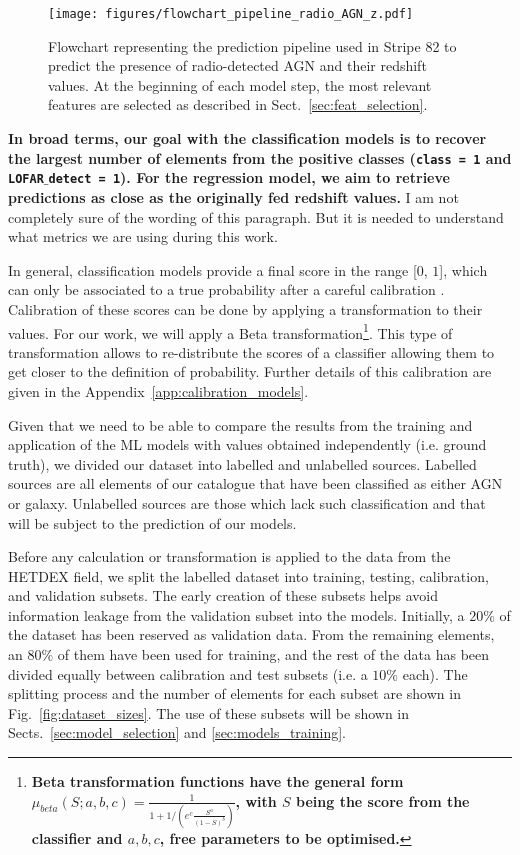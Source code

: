 \documentclass{aa}
\begin{document}
\begin{figure}
   \centering
   \texttt{[image: figures/flowchart\_pipeline\_radio\_AGN\_z.pdf]}
   \caption{Flowchart representing the prediction pipeline used in Stripe 82 to predict the presence of radio-detected AGN and their redshift values. At the beginning of each model step, the most relevant features are selected as described in Sect.~\ref{sec:feat_selection}.}
   \label{fig:pipeline_flowchart}
\end{figure}

\textbf{In broad terms, our goal with the classification models is to recover the largest number of elements from the positive classes (\texttt{class = 1} and \texttt{LOFAR$\_$detect = 1}). For the regression model, we aim to retrieve predictions as close as the originally fed redshift values.}
{\color{red} I am not completely sure of the wording of this paragraph. 
But it is needed to understand what metrics we are using during this work.}

In general, classification models provide a final score in the range [$0$, $1$], which can only be associated to a true probability after a careful calibration  \citep{10.1214/17-EJS1338SI, pmlr-v54-kull17a}. Calibration of these scores can be done by applying a transformation to their values. For our work, we will apply a Beta transformation\footnote{\textbf{Beta transformation functions have the general form $\mu_{beta}(S;a,b,c) = \frac{1}{1 + 1 / \left(e^{c} \frac{S^{a}}{(1 - S)^{b}}\right)}$, with $S$ being the score from the classifier and $a,b,c$, free parameters to be optimised.}}. This type of transformation allows to re-distribute the scores of a classifier allowing them to get closer to the definition of probability. Further details of this calibration are given in the Appendix~\ref{app:calibration_models}.

Given that we need to be able to compare the results from the training and application of the ML models with values obtained independently (i.e. ground truth), we divided our dataset into labelled and unlabelled sources. Labelled sources are all elements of our catalogue that have been classified as either AGN or galaxy. Unlabelled sources are those which lack such classification and that will be subject to the prediction of our models.  

Before any calculation or transformation is applied to the data from the HETDEX field, we split the labelled dataset into training, testing, calibration, and validation subsets. The early creation of these subsets helps avoid information leakage from the validation subset into the models. Initially, a $20 \%$ of the dataset has been reserved as validation data. From the remaining elements, an $80 \%$ of them have been used for training, and the rest of the data has been divided equally between calibration and test subsets (i.e. a $10 \%$ each). The splitting process and the number of elements for each subset are shown in Fig.~\ref{fig:dataset_sizes}. The use of these subsets will be shown in Sects.~\ref{sec:model_selection} and \ref{sec:models_training}.
\end{document}
